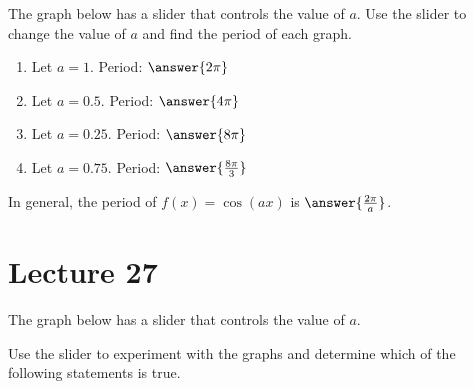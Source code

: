 \documentclass{ximera}
\begin{document}
\begin{problem}\label{prob:160hom11prob4}  
 The graph below has a slider that controls the value of $a$.  Use the slider to change the value of $a$ and find the period of each graph.
  \begin{center} 
\end{center}
\begin{enumerate}
    \item Let $a=1$.  Period: $\answer{2\pi}$
    \item Let $a=0.5$.  Period: $\answer{4\pi}$
    \item Let $a=0.25$.  Period: $\answer{8\pi}$
    \item Let $a=0.75$.  Period: $\answer{\frac{8\pi}{3}}$
\end{enumerate}
In general, the period of $f(x)=\cos (ax)$ is $\answer{\frac{2\pi}{a}}$.
\end{problem}
 


\section{Lecture 27}

\begin{problem}\label{prob:160hom11prob5}  
 The graph below has a slider that controls the value of $a$. 
  \begin{center} 
\end{center}
Use the slider to experiment with the graphs and determine which of the following statements is true.
\begin{multipleChoice}  
\end{multipleChoice}  
\end{problem}  
  
\end{document}
